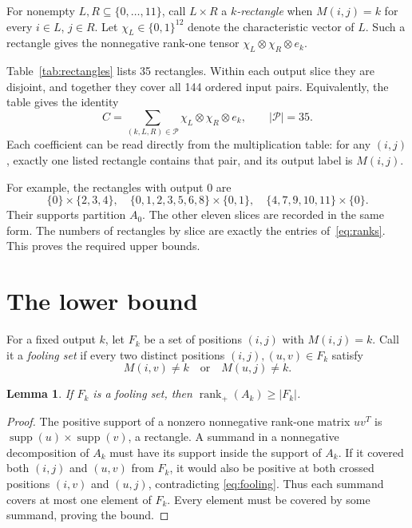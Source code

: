 \documentclass[11pt,a4paper]{article}
\newtheorem{lemma}[theorem]{Lemma}
\theoremstyle{definition}
\DeclareMathOperator{\rank}{rank}
\DeclareMathOperator{\supp}{supp}
\begin{document}
For nonempty $L,R\subseteq\{0,\ldots,11\}$, call $L\times R$ a
\emph{$k$-rectangle} when $M(i,j)=k$ for every $i\in L$, $j\in R$.
Let $\chi_L\in\{0,1\}^{12}$ denote the characteristic vector of $L$.
Such a rectangle gives the nonnegative rank-one tensor
$\chi_L\otimes\chi_R\otimes e_k$.

Table~\ref{tab:rectangles} lists 35 rectangles. Within each output slice
they are disjoint, and together they cover all 144 ordered input pairs.
Equivalently, the table gives the identity
\begin{equation}\label{eq:decomposition}
 C=\sum_{(k,L,R)\in\mathcal P}\chi_L\otimes\chi_R\otimes e_k,
 \qquad |\mathcal P|=35.
\end{equation}
Each coefficient can be read directly from the multiplication table:
for any $(i,j)$, exactly one listed rectangle contains that pair, and its
output label is $M(i,j)$.

For example, the rectangles with output $0$ are
\[
 \{0\}\times\{2,3,4\},\quad
 \{0,1,2,3,5,6,8\}\times\{0,1\},\quad
 \{4,7,9,10,11\}\times\{0\}.
\]
Their supports partition $A_0$. The other eleven slices are recorded in
the same form. The numbers of rectangles by slice are exactly the entries
of~\eqref{eq:ranks}. This proves the required upper bounds.

\section{The lower bound}

For a fixed output $k$, let $F_k$ be a set of positions $(i,j)$ with
$M(i,j)=k$. Call it a \emph{fooling set} if every two distinct positions
$(i,j),(u,v)\in F_k$ satisfy
\begin{equation}\label{eq:fooling}
 M(i,v)\ne k\quad\text{or}\quad M(u,j)\ne k.
\end{equation}

\begin{lemma}\label{lem:fooling}
If $F_k$ is a fooling set, then $\rank_+(A_k)\geq |F_k|$.
\end{lemma}

\begin{proof}
The positive support of a nonzero nonnegative rank-one matrix $uv^T$
is $\supp(u)\times\supp(v)$, a rectangle. A summand in a nonnegative
decomposition of $A_k$ must have its support inside the support of $A_k$.
If it covered both $(i,j)$ and $(u,v)$ from $F_k$, it would also be
positive at both crossed positions $(i,v)$ and $(u,j)$, contradicting
\eqref{eq:fooling}. Thus each summand covers at most one element of $F_k$.
Every element must be covered by some summand, proving the bound.
\end{proof}
\end{document}
